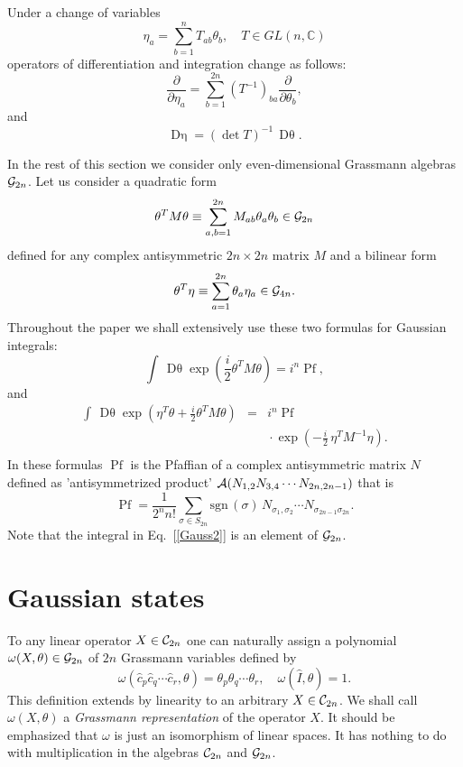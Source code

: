\documentclass[twocolumn,showpacs,preprintnumbers,superscriptaddress]{revtex4}
\newcommand{\CC}{\mathbb{C}}
\newcommand{\calA}{{\cal A }}
\newcommand{\Clif}{{\cal C}}
\newcommand{\Gr}{{\cal G}}
\newcommand{\drv}[1]{\frac{\partial}{\partial{#1}}}
\newcommand{\D}[1]{\mathop{\mathrm{D}#1}}
\newcommand{\be}{\begin{equation}}
\newcommand{\ee}{\end{equation}}
\newcommand{\nn}{\nonumber}
\newcommand{\Pf}[1]{\mathop{\mathrm{Pf}(#1)}}
\newcommand{\cop}{{\hat{c}}}
\newcommand{\Iop}{{\hat{I}}}
\begin{document}
Under a change of variables
\be\label{Jacobian0}
\eta_a = \sum_{b=1}^n T_{ab} \theta_b, \quad T\in GL(n,\CC)
\ee
operators of differentiation and integration change as follows:
\be\label{Jacobian}
\drv{\eta_a} = \sum_{b=1}^{2n} \left( T^{-1} \right)_{ba} \drv{\theta_b},
\ee
and
\be\label{Jacobian'}
\D{\eta} = \left( \det{T}\right)^{-1} \, \D{\theta}.
\ee

In the rest of this section we consider only even-dimensional Grassmann algebras
$\Gr_{2n}$. Let us consider a quadratic form
\[
\theta^T M \theta \equiv \sum_{a,b=1}^{2n} M_{ab} \theta_a \theta_b \in \Gr_{2n}
\]
defined for any complex antisymmetric $2n\times 2n$ matrix $M$ and
a bilinear form
\[
\theta^T \eta \equiv \sum_{a=1}^{2n} \theta_a \eta_a \in \Gr_{4n}.
\]
Throughout the paper we shall extensively use these two formulas for Gaussian integrals:
\be\label{Gauss1}
\int\, \D{\theta} \exp{\left( \frac{i}2 \theta^T M \theta \right)}
= i^n \Pf{M},
\ee
and 
\begin{eqnarray}
\label{Gauss2}
\int\, \D{\theta} \exp{\left(\eta^T\theta  +  \frac{i}2 \theta^T M \theta \right)} &=&
i^n \Pf{M} \nn \\
&& {} \cdot \exp{\left( -\frac{i}2\, \eta^T M^{-1} \eta \right)}. \nn \\
\end{eqnarray}
In these formulas $\Pf{N}$ is the Pfaffian of a complex antisymmetric matrix $N$ defined as
'antisymmetrized product' $\calA(N_{1,2}N_{3,4}\cdots N_{2n,2n-1})$ that is
\[
\Pf{N}=\frac1{2^n n!} \sum_{\sigma \in S_{2n}} \mbox{sgn}\,{(\sigma)}\,
N_{\sigma_1,\sigma_2} \cdots N_{\sigma_{2n-1}\sigma_{2n}}.
\]
Note that the integral in Eq.~[\ref{Gauss2}] is an element of $\Gr_{2n}$.



\section{Gaussian states}
\label{sec:isom}

To any linear operator $X\in \Clif_{2n}$ one can naturally assign a
polynomial $\omega(X,\theta)\in \Gr_{2n}$ of $2n$ Grassmann variables
defined by
\[
\omega(\cop_p\cop_q\cdots \cop_r,\theta)=\theta_p\theta_q\cdots \theta_r,
\quad \omega(\Iop,\theta)=1.
\]
This definition extends by linearity to an arbitrary $X\in \Clif_{2n}$.
We shall call $\omega(X,\theta)$ a {\it Grassmann representation} of the
operator $X$.
It should be emphasized that $\omega$ is just an isomorphism of linear spaces.
It has nothing to do with multiplication in the algebras $\Clif_{2n}$ and $\Gr_{2n}$.
\end{document}
